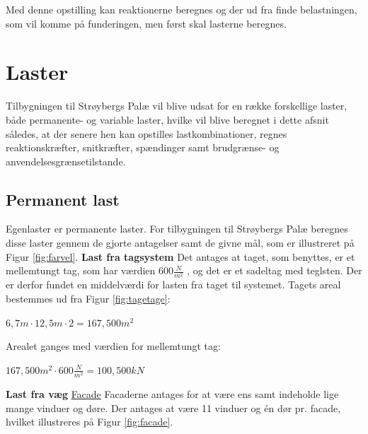 Med denne opstilling kan reaktionerne beregnes og der ud fra finde belastningen, som vil komme på funderingen, men først skal lasterne beregnes.

\section{Laster}
Tilbygningen til Strøybergs Palæ vil blive udsat for en række forskellige laster, både permanente- og variable laster, hvilke vil blive beregnet i dette afsnit således, at der senere hen kan opstilles lastkombinationer, regnes reaktionskræfter, snitkræfter, spændinger samt brudgrænse- og anvendelsesgrænsetilstande.

\subsection{Permanent last}
Egenlaster er permanente laster. For tilbygningen til Strøybergs Palæ beregnes disse laster gennem de gjorte antagelser samt de givne mål, som er illustreret på Figur \ref{fig:farvel}.
\newline
\newline
\textbf{Last fra tagsystem}
\newline
Det antages at taget, som benyttes, er et mellemtungt tag, som har værdien $600 \frac{N}{m^2}$ \citep{tag}, og det er et sadeltag med teglsten. Der er derfor fundet en middelværdi for lasten fra taget til systemet. 
\newline
\newline
Tagets areal bestemmes ud fra Figur \ref{fig:tagetage}:
\begin{center}
	$6,\!7 m\cdot 12,\!5 m \cdot 2=167,\!500 m^2$
\end{center}

Arealet ganges med værdien for mellemtungt tag:
\begin{center}
	$167,\!500 m^2\cdot 600 \frac{N}{m^2}=100,\!500 kN$
\end{center}

\textbf{Last fra væg}
\newline
\newline
\underline{Facade}
\newline
Facaderne antages for at være ens samt indeholde lige mange vinduer og døre. Der antages at være 11 vinduer og én dør pr. facade, hvilket illustreres på Figur \ref{fig:facade}.

